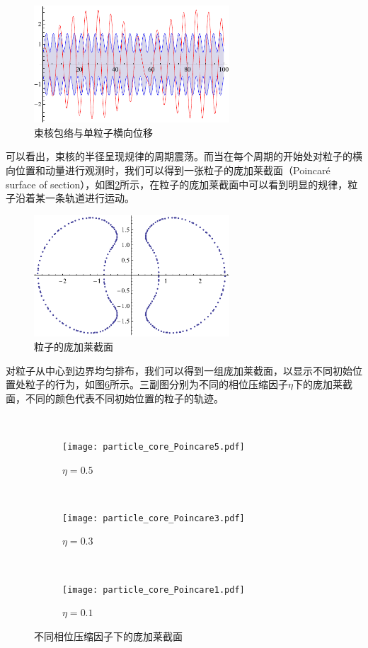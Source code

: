 \begin{figure}[!tbh]
    \centering
    \includegraphics[width=0.65\textwidth]{Img/particle_core_envelope.pdf}
    \caption{束核包络与单粒子横向位移}
    \label{fig:particle_core_envelope}
\end{figure}

可以看出，束核的半径呈现规律的周期震荡。而当在每个周期的开始处对粒子的横向位置和动量进行观测时，我们可以得到一张粒子的庞加莱截面（Poincaré surface of section），如图\ref{fig:particle_core_particle}所示，在粒子的庞加莱截面中可以看到明显的规律，粒子沿着某一条轨道进行运动。
\begin{figure}[!tbh]
    \centering
    \includegraphics[width=0.65\textwidth]{Img/particle_core_particle.pdf}
    \caption{粒子的庞加莱截面}
    \label{fig:particle_core_particle}
\end{figure}

对粒子从中心到边界均匀排布，我们可以得到一组庞加莱截面，以显示不同初始位置处粒子的行为，如图\ref{fig:particle_core_Poincare}所示。三副图分别为不同的相位压缩因子$\eta$下的庞加莱截面，不同的颜色代表不同初始位置的粒子的轨迹。
\begin{figure}[!htbp]
  \centering
  ~%
  \begin{subfigure}[b]{0.6\textwidth}
    \texttt{[image: particle\_core\_Poincare5.pdf]}
    \caption{$\eta = 0.5$}
    \label{fig:particle_core_Poincare5}
  \end{subfigure}
  ~
  \begin{subfigure}[b]{0.6\textwidth}
    \texttt{[image: particle\_core\_Poincare3.pdf]}
    \caption{$\eta = 0.3$}
    \label{fig:particle_core_Poincare3}
  \end{subfigure}%
  ~
  \begin{subfigure}[b]{0.6\textwidth}
    \texttt{[image: particle\_core\_Poincare1.pdf]}
    \caption{$\eta = 0.1$}
    \label{fig:particle_core_Poincare1}
  \end{subfigure}%
  \caption{不同相位压缩因子下的庞加莱截面}
  \label{fig:particle_core_Poincare}
\end{figure}

